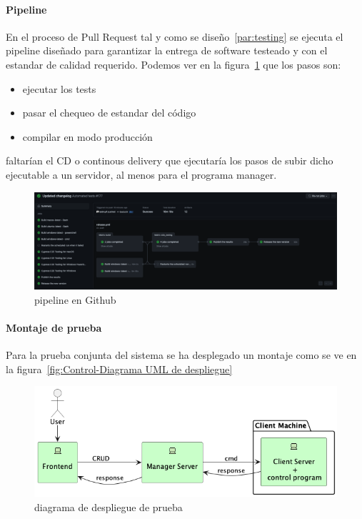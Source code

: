 
\paragraph{Pipeline}\label{par:pipeline}

En el proceso de Pull Request tal y como se diseño~\cref{par:testing} se ejecuta el pipeline diseñado para garantizar la entrega de software testeado y con el estandar de calidad requerido. Podemos ver en la figura~\cref{fig:githubActions} que los pasos son:

\begin{itemize}
    \item ejecutar los tests
    \item pasar el chequeo de estandar del código
    \item compilar en modo producción
\end{itemize}

faltarían el CD o continous delivery que ejecutaría los pasos de subir dicho ejecutable a un servidor, al menos para el programa manager.

\begin{figure}[H]
    \centering
    \includegraphics[height=0.2\textheight]{./part/Ejecucion/Seguimiento/PuestaAPunto/img/githubPipelines}
    \caption{pipeline en Github}\label{fig:githubActions}
\end{figure}

\paragraph{Montaje de prueba}\label{par:montaje}

Para la prueba conjunta del sistema se ha desplegado un montaje como se ve en la figura~\cref{fig:Control-Diagrama UML de despliegue}

\begin{figure}[H]
    \centering
    \includegraphics[height=0.2\textheight]{./part/Ejecucion/Seguimiento/PuestaAPunto/img/deploy}
    \caption{diagrama de despliegue de prueba}\label{fig:despliegue de prueba}
\end{figure}

